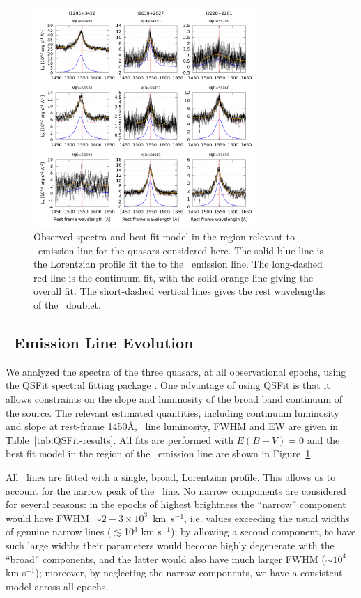 \documentclass[fleqn,usenatbib]{mnras}
\begin{document}
\begin{figure}
  \centering
  \includegraphics[width=8.40cm, trim=0.37cm 0.3cm 0.0cm 0.2cm, clip]{figures/CIVregions.png}
    \vspace{-18pt}
  \caption{Observed spectra and best fit model in the region relevant
    to \civ\ emission line for the quasars considered here.
    The solid blue line is the Lorentzian profile fit the to the \civ\ emission line.
    The long-dashed red line is the continuum fit, with the solid orange
    line giving the overall fit. The short-dashed vertical lines gives the
    rest wavelengths of the \civ\ doublet. }
  \label{fig:QSFit-CIV}
\end{figure}
\subsection{\civ\ Emission Line Evolution}
We analyzed the spectra of the three quasars, at all observational
epochs, using the QSFit spectral fitting package
\citep{Calderone2017}.  One advantage of using QSFit is that it allows
constraints on the slope and luminosity of the broad band continuum of
the source. The relevant estimated quantities, including continuum
luminosity and slope at rest-frame 1450\AA, \civ\ line luminosity,
FWHM and EW are given in Table~\ref{tab:QSFit-results}. All fits are
performed with $E(B-V) = 0$ and the best fit model in the region of
the \civ\ emission line are shown in Figure~\ref{fig:QSFit-CIV}.

All \civ\ lines are fitted with a single, broad, Lorentzian profile.
This allows us to account for the narrow peak of the \civ\ line.  No
narrow components are considered for several reasons: in the epochs of
highest brightness the ``narrow'' component would have FWHM~$\sim2-3
\times 10^{3}$~km~s$^{-1}$, i.e. values exceeding the usual widths of
genuine narrow lines ($\lesssim$10$^{3}$ km s$^{-1}$); by allowing a
second component, to have such large widths their parameters would
become highly degenerate with the ``broad'' components, and the latter
would also have much larger FWHM ($\sim$$10^{4}$ km s$^{-1}$); moreover, by
neglecting the narrow components, we have a consistent model across all
epochs.
\end{document}
